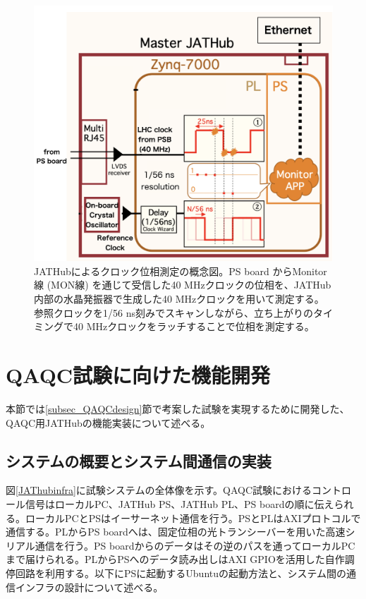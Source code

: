 \begin{figure} 
    \centering
    \includegraphics[width=14cm]{fig/QAQC/JATHubclockmasurement.png}
    \caption[JATHubによるクロック位相測定の概念図]{JATHubによるクロック位相測定の概念図\cite{mt_atanaka}。PS board からMonitor線 (MON線) を通じて受信した40 MHzクロックの位相を、JATHub内部の水晶発振器で生成した40 MHzクロックを用いて測定する。参照クロックを1/56 ns刻みでスキャンしながら、立ち上がりのタイミングで40 MHzクロックをラッチすることで位相を測定する。}
    \label{JATHubclockmeasure}
\end{figure}    

\section{QAQC試験に向けた機能開発}
\label{sec_QAQC_JATHub}
本節では\ref{subsec_QAQCdesign}節で考案した試験を実現するために開発した、QAQC用JATHubの機能実装について述べる。

\subsection{システムの概要とシステム間通信の実装}
\label{subsec_infra}
図\ref{JAThubinfra}に試験システムの全体像を示す。QAQC試験におけるコントロール信号はローカルPC、JATHub PS、JATHub PL、PS boardの順に伝えられる。ローカルPCとPSはイーサーネット通信を行う。PSとPLはAXIプロトコルで通信する。PLからPS boardへは、固定位相の光トランシーバーを用いた高速シリアル通信を行う。PS boardからのデータはその逆のパスを通ってローカルPCまで届けられる。PLからPSへのデータ読み出しはAXI GPIOを活用した自作調停回路を利用する。以下にPSに起動するUbuntuの起動方法と、システム間の通信インフラの設計について述べる。

